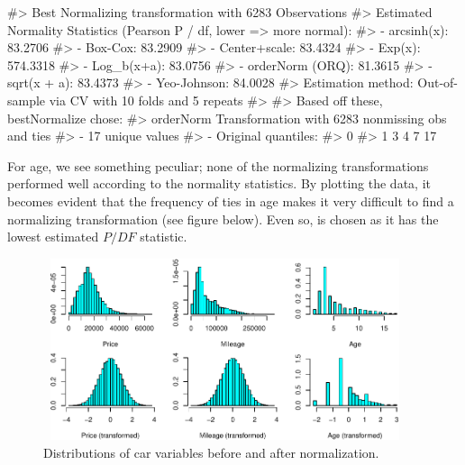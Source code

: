\begin{Schunk}

\begin{Soutput}
#> Best Normalizing transformation with 6283 Observations
#>  Estimated Normality Statistics (Pearson P / df, lower => more normal):
#>  - arcsinh(x): 83.2706
#>  - Box-Cox: 83.2909
#>  - Center+scale: 83.4324
#>  - Exp(x): 574.3318
#>  - Log_b(x+a): 83.0756
#>  - orderNorm (ORQ): 81.3615
#>  - sqrt(x + a): 83.4373
#>  - Yeo-Johnson: 84.0028
#> Estimation method: Out-of-sample via CV with 10 folds and 5 repeats
#>  
#> Based off these, bestNormalize chose:
#> orderNorm Transformation with 6283 nonmissing obs and ties
#>  - 17 unique values 
#>  - Original quantiles:
#>   0%
#>    1    3    4    7   17
\end{Soutput}
\end{Schunk}

For age, we see something peculiar; none of the normalizing
transformations performed well according to the normality statistics. By
plotting the data, it becomes evident that the frequency of ties in age
makes it very difficult to find a normalizing transformation (see figure
below). Even so,  is chosen as it has the lowest
estimated \(P/DF\) statistic.

\begin{Schunk}
\begin{figure}

{\centering \includegraphics[width=4.2in,height=2.1in]{figs/histapp-1} 

}

\caption[Distributions of car variables before and after normalization]{Distributions of car variables before and after normalization.}\label{fig:histapp}
\end{figure}
\end{Schunk}

